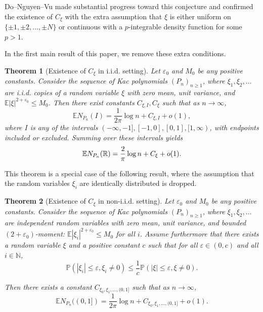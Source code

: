 \documentclass[12pt, reqno]{amsart}
\theoremstyle{plain}
\newtheorem{theorem}{Theorem}[section]
\theoremstyle{definition}
\newcommand\N{{\mathbb{N}}}
\newcommand\R{{\mathbb{R}}}
\renewcommand\P{{\mathbb{P}}}
\newcommand\E{{\mathbb{E}}}
\newcommand{\ep}{\varepsilon}
\begin{document}
 Do--Nguyen--Vu \cite{DoHoiNguyenVu} made substantial progress toward this conjecture and confirmed the existence of $C_{\xi}$ with the extra assumption that $\xi$ is either uniform on $\{\pm 1, \pm 2, \ldots, \pm N\}$ or continuous with a $p$-integrable density function for some $p>1$.
 
 
 \vspace{5mm}
 
In the first main result of this paper, we remove these extra conditions.
\begin{theorem} [Existence of $C_{\xi}$ in i.i.d. setting]\label{thm:mainthm1}
Let $\ep_0$ and $M_0$ be any positive constants. Consider the sequence of Kac polynomials $(P_n)_{n \ge 1}$, where $\xi_1, \xi_2, \dots$ are i.i.d. copies of a random variable $\xi$ with zero mean, unit variance, and $\E |\xi|^{ 2 + \ep_0}\le M_0$. Then there exist constants $C_{\xi, I}, C_{\xi}$ such that as $n\to\infty$,
\begin{equation}
    \E N_{P_n}(I) = \dfrac{1}{2\pi}\log n + C_{\xi, I} + o(1), \label{eq:I1}
\end{equation}
where $I$ is any of the intervals $(-\infty, -1], [-1, 0], [0, 1], [1, \infty)$, with endpoints included or excluded. Summing over these intervals yields
\begin{equation}
	\E N_{P_n}(\R) = \dfrac{2}{\pi}\log n + C_{\xi} + o(1).\notag
\end{equation}
\end{theorem}
This theorem is a special case of the following result, where the assumption that the random variables $\xi_i$ are identically distributed is dropped.
 \begin{theorem}[Existence of $C_{\xi}$ in non-i.i.d. setting]\label{thm:mainthm}
 	Let $\ep_0$ and $M_0$ be any positive constants. Consider the sequence of Kac polynomials $(P_n)_{n \ge 1}$, where $\xi_1, \xi_2, \dots$ are independent random variables with zero mean, unit variance, and bounded $(2+\ep_0)$-moment: $\E |\xi_i|^{ 2 + \ep_0}\le M_0$ for all $i$. Assume furthermore that there exists a random variable $ \xi$ and a positive constant $c$ such that for all $\ep\in (0, c)$ and all $i\in \N$,
 	\begin{equation}\label{cond:decay0}
 		\P(|\xi_i|\le \ep, \xi_i\neq 0) \le \frac{1}{c}\P(| \xi|\le \ep,  \xi\neq 0).
 	\end{equation}
 	
 	
 	Then there exists a constant $C_{\xi_0, \xi_1, \dots, (0, 1]}$ such that as $n\to\infty$,
 	\begin{equation}
 		\E N_{P_n}((0, 1] ) = \dfrac{1}{2\pi}\log n + C_{\xi_0, \xi_1, \dots, (0, 1]} + o(1). \label{eq:I}
 	\end{equation}
 \end{theorem}
 
\end{document}
